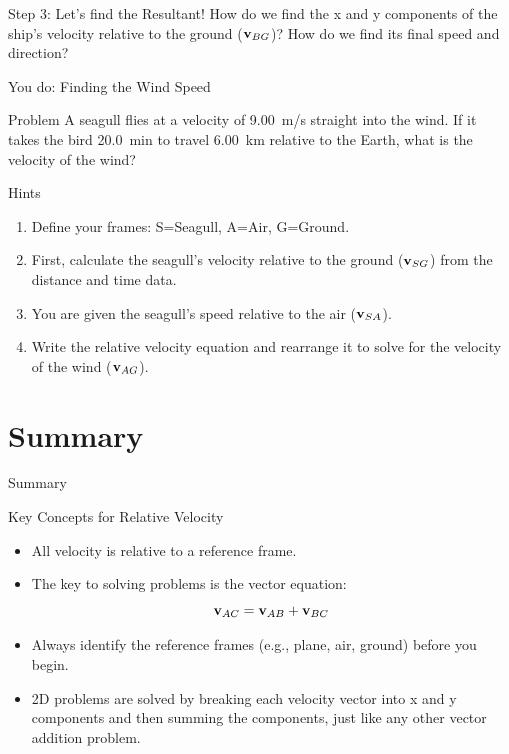\documentclass{beamer}
\begin{document}
\begin{frame}
    \begin{alertblock}{Step 3: Let's find the Resultant!}
        How do we find the x and y components of the ship's velocity relative to the ground ($\vb{v}_{BG}$)? How do we find its final speed and direction?
    \end{alertblock}
\end{frame}

\begin{frame}{You do: Finding the Wind Speed}
    \begin{block}{Problem}
        A seagull flies at a velocity of \SI{9.00}{m/s} straight into the wind. If it takes the bird \SI{20.0}{min} to travel \SI{6.00}{km} relative to the Earth, what is the velocity of the wind?
    \end{block}
    
    \begin{alertblock}{Hints}
        \begin{enumerate}
            \item Define your frames: S=Seagull, A=Air, G=Ground.
            \item First, calculate the seagull's velocity relative to the ground ($\vb{v}_{SG}$) from the distance and time data.
            \item You are given the seagull's speed relative to the air ($\vb{v}_{SA}$).
            \item Write the relative velocity equation and rearrange it to solve for the velocity of the wind ($\vb{v}_{AG}$).
        \end{enumerate}
    \end{alertblock}
\end{frame}

\section{Summary}

\begin{frame}{Summary}
    \begin{block}{Key Concepts for Relative Velocity}
        \begin{itemize}
            \item All velocity is relative to a reference frame.
            \item The key to solving problems is the vector equation:
            \[ \vb{v}_{AC} = \vb{v}_{AB} + \vb{v}_{BC} \]
            \item Always identify the reference frames (e.g., plane, air, ground) before you begin.
            \item 2D problems are solved by breaking each velocity vector into x and y components and then summing the components, just like any other vector addition problem.
        \end{itemize}
    \end{block}
\end{frame}
\end{document}
